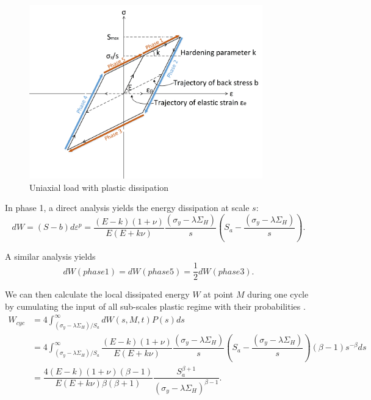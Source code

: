 \begin{figure}[!h]
\centering
\includegraphics[width=0.9\textwidth]{figures//backstress.png} 
\caption{Uniaxial load with plastic dissipation}
\label{backstress}
\end{figure}

In phase 1, a direct analysis yields the energy dissipation at scale $s$:
\begin{equation}dW=(S-b)d\varepsilon^p=\dfrac{(E-k)(1+\nu) }{E(E+k\nu)}\dfrac{ \left(\sigma_y-\lambda \Sigma_H\right)}{s}\left(S_{a}-\dfrac{ \left(\sigma_y-\lambda \Sigma_H\right)}{s}\right).
\label{dw}
\end{equation}

A similar analysis yields $$dW(phase 1)=dW(phase 5)=\dfrac{1}{2}dW(phase 3).$$

We can then calculate  the local dissipated energy $W$  at point $M$ during one cycle by cumulating the input of all sub-scales plastic regime with their probabilities \cite{zepeng}.
\begin{equation}
\begin{split}
W_{cyc}&=4\int_{ \left(\sigma_y-\lambda \Sigma_H\right) /S_{a}}^{\infty}dW(s,M,t)P(s)ds
\\&=4\int_{ \left(\sigma_y-\lambda \Sigma_H\right) /S_{a}}^{\infty}\dfrac{(E-k)(1+\nu) }{E(E+k\nu)}\dfrac{ \left(\sigma_y-\lambda \Sigma_H\right)}{s}\left(S_{a}-\dfrac{ \left(\sigma_y-\lambda \Sigma_H\right)}{s}\right)\left( \beta-1\right) s^{-\beta}ds
\\&=\dfrac{4(E-k)(1+\nu)\left( \beta-1\right) }{ E(E+k\nu)\beta\left( \beta+1\right) }\dfrac{S_{a}^{\beta+1}}{ \left(\sigma_y-\lambda \Sigma_H\right)^{\beta-1}}.
\end{split}
\label{eq:w}
\end{equation}

